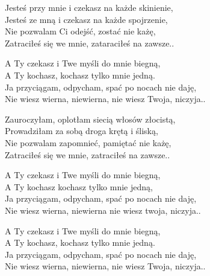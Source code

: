 \begin{text}
    Jesteś przy mnie i czekasz na każde skinienie,\\
    Jesteś ze mną i czekasz na każde spojrzenie,\\
    Nie pozwalam Ci odejść, zostać nie każę,\\
    Zatraciłeś się we mnie, zataraciłeś na zawsze..

    A Ty czekasz i Twe myśli do mnie biegną,\\
    A Ty kochasz, kochasz tylko mnie jedną.\\
    Ja przyciągam, odpycham, spać po nocach nie daję,\\
    Nie wiesz wierna, niewierna, nie wiesz Twoja, niczyja..

    Zauroczyłam, oplotłam siecią włosów złocistą,\\
    Prowadziłam za sobą droga krętą i śliską,\\
    Nie pozwalam zapomnieć, pamiętać nie każę,\\
    Zatraciłeś się we mnie, zatraciłeś na zawsze..

    A Ty czekasz i Twe myśli do mnie biegną,\\
    A Ty kochasz kochasz tylko mnie jedną,\\
    Ja przyciągam, odpycham, spać po nocach nie daję,\\
    Nie wiesz wierna, niewierna nie wiesz twoja, niczyja..

    A Ty czekasz i Twe myśli do mnie biegną,\\
    A Ty kochasz, kochasz tylko mnie jedną.\\
    Ja przyciągam, odpycham, spać po nocach nie daję,\\
    Nie wiesz wierna, niewierna, nie wiesz Twoja, niczyja..
\end{text}
\begin{chord}

\end{chord}